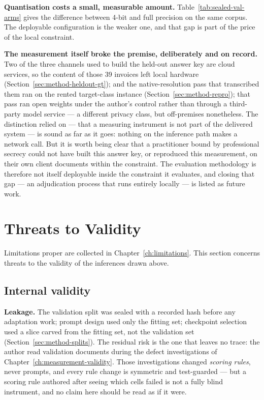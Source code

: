 \textbf{Quantisation costs a small, measurable amount.} Table~\ref{tab:sealed-val-arms} gives
the difference between 4-bit and full precision on the same corpus. The deployable configuration
is the weaker one, and that gap is part of the price of the local constraint.

\textbf{The measurement itself broke the premise, deliberately and on record.} Two of the
three channels used to build the held-out answer key are cloud services, so the content of
those 39 invoices left local hardware (Section~\ref{sec:method-heldout-gt}); and the
native-resolution pass that transcribed them ran on the rented target-class instance
(Section~\ref{sec:method-repro}); that pass ran open weights under the author's control rather
than through a third-party model service --- a different privacy class, but off-premises
nonetheless. The distinction
relied on --- that a
measuring instrument is not part of the delivered system --- is sound as far as it goes: nothing
on the inference path makes a network call. But it is worth being clear that a practitioner
bound by professional secrecy could not have built this answer key, or reproduced this
measurement, on their own client documents within the constraint. The evaluation methodology
is therefore not itself deployable inside the constraint it
evaluates, and closing that gap --- an adjudication process that runs entirely locally --- is
listed as future work.

\section{Threats to Validity}
\label{sec:disc-threats}

Limitations proper are collected in Chapter~\ref{ch:limitations}. This section
concerns threats to the validity of the inferences drawn above.

\subsection{Internal validity}

\textbf{Leakage.} The validation split was sealed with a recorded hash before any adaptation
work; prompt design used only the fitting set; checkpoint selection used a slice carved from the
fitting set, not the validation set (Section~\ref{sec:method-splits}). The residual risk is the one
that leaves no trace: the author read validation documents during the defect investigations of
Chapter~\ref{ch:measurement-validity}. Those investigations changed \emph{scoring rules}, never
prompts, and every rule change is symmetric and test-guarded --- but a scoring rule authored
after seeing which cells failed is not a fully blind instrument, and no claim here should be read
as if it were.

